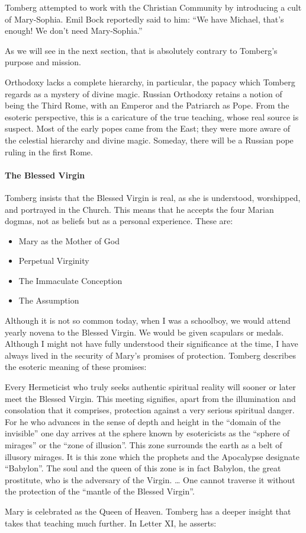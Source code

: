 Tomberg attempted to work with the Christian Community by introducing a cult of Mary-Sophia. Emil Bock reportedly said
to him: “We have Michael, that's enough! We don't need Mary-Sophia.”

As we will see in the next section, that is absolutely contrary to Tomberg's purpose and mission.

Orthodoxy lacks a complete hierarchy, in particular, the papacy which Tomberg regards as a mystery of divine magic.
Russian Orthodoxy retains a notion of being the Third Rome, with an Emperor and the Patriarch as Pope. From the
esoteric perspective, this is a caricature of the true teaching, whose real source is suspect. Most of the early popes
came from the East; they were more aware of the celestial hierarchy and divine magic. Someday, there will be a Russian
pope ruling in the first Rome.

\paragraph{The Blessed Virgin}
Tomberg insists that the Blessed Virgin is real, as she is understood, worshipped, and portrayed in the Church. This
means that he accepts the four Marian dogmas, not as beliefs but as a personal experience. These are:

\begin{itemize}
\item Mary as the Mother of God 
\item Perpetual Virginity 
\item The Immaculate Conception 
\item The Assumption 
\end{itemize}
Although it is not so common today, when I was a schoolboy, we would attend yearly novena to the Blessed Virgin. We
would be given scapulars or medals. Although I might not have fully understood their significance at the time, I have
always lived in the security of Mary's promises of protection. Tomberg describes the esoteric meaning of
these promises:

\begin{quotationx}
Every Hermeticist who truly seeks authentic spiritual reality will sooner or later meet the Blessed Virgin. This meeting
signifies, apart from the illumination and consolation that it comprises, protection against a very serious spiritual
danger. For he who advances in the sense of depth and height in the “domain of the invisible” one day arrives at the
sphere known by esotericists as the “sphere of mirages” or the “zone of illusion”. This zone surrounds the earth as a
belt of illusory mirages. It is this zone which the prophets and the Apocalypse designate “Babylon”. The soul and the
queen of this zone is in fact Babylon, the great prostitute, who is the adversary of the Virgin. … One cannot traverse
it without the protection of the “mantle of the Blessed Virgin”. 

\end{quotationx}
Mary is celebrated as the Queen of Heaven. Tomberg has a deeper insight that takes that teaching much further. In Letter
XI, he asserts:

